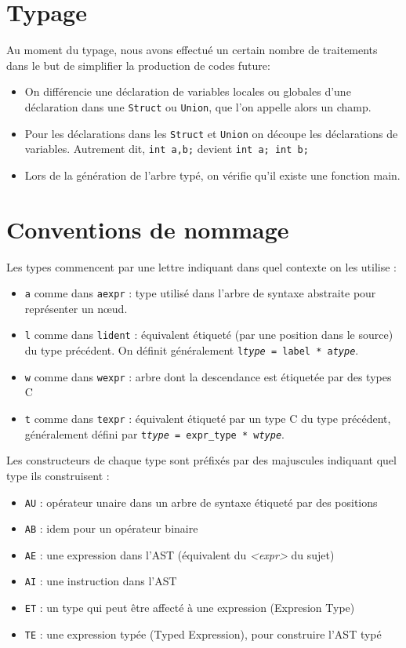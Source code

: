 \documentclass[a4paper]{article}
\begin{document}
\section{Typage}

Au moment du typage, nous avons effectué un certain nombre de traitements
dans le but de simplifier la production de codes future:
\begin{itemize}
\item On différencie une déclaration de variables locales ou globales d'une
déclaration dans une \texttt{Struct} ou \texttt{Union}, que l'on appelle
alors un champ.
\item Pour les déclarations dans les \texttt{Struct} et \texttt{Union} on
découpe les déclarations de variables. Autrement dit, \texttt{int a,b;}
devient \texttt{int a; int b;}
\item Lors de la génération de l'arbre typé, 
on vérifie qu'il existe une fonction main.
\end{itemize}

\appendix
\section{Conventions de nommage}

Les types commencent par une lettre indiquant dans quel contexte on les utilise :
\begin{itemize}
    \item \texttt{a} comme dans \texttt{aexpr} : type utilisé dans l'arbre de syntaxe abstraite pour représenter un nœud.
    \item \texttt{l} comme dans \texttt{lident} : équivalent étiqueté (par une position dans le source) du type précédent.
    On définit généralement \texttt{l\emph{type} = label * a\emph{type}}.
\item \texttt{w} comme dans \texttt{wexpr} : arbre dont la descendance est étiquetée par des types C
\item \texttt{t} comme dans \texttt{texpr} : équivalent étiqueté par un type C du type précédent, généralement défini par \texttt{t\emph{type} = expr\_type * w\emph{type}}.
\end{itemize}

Les constructeurs de chaque type sont préfixés par des majuscules indiquant quel type ils construisent :
\begin{itemize}
    \item \texttt{AU} : opérateur unaire dans un arbre de syntaxe étiqueté par des positions
    \item \texttt{AB} : idem pour un opérateur binaire
    \item \texttt{AE} : une expression dans l'AST (équivalent du \emph{<expr>} du sujet)
    \item \texttt{AI} : une instruction dans l'AST
    \item \texttt{ET} : un type qui peut être affecté à une expression (Expresion Type)
    \item \texttt{TE} : une expression typée (Typed Expression), pour construire l'AST typé
\end{itemize}
\end{document}
